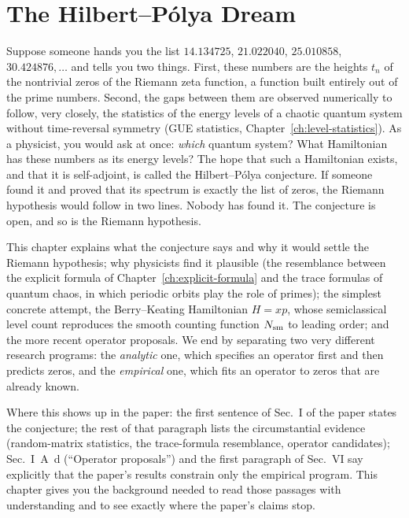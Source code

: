 \chapter{The Hilbert--P\'olya Dream}\label{ch:hilbert-polya}

\begin{chapterintro}
Suppose someone hands you the list $14.134725$, $21.022040$, $25.010858$, $30.424876,\dots$ and tells you two things. First, these numbers are the heights $t_n$ of the nontrivial zeros of the Riemann zeta function, a function built entirely out of the prime numbers. Second, the gaps between them are observed numerically to follow, very closely, the statistics of the energy levels of a chaotic quantum system without time-reversal symmetry (GUE statistics, Chapter~\ref{ch:level-statistics}). As a physicist, you would ask at once: \emph{which} quantum system? What Hamiltonian has these numbers as its energy levels? The hope that such a Hamiltonian exists, and that it is self-adjoint, is called the Hilbert--P\'olya conjecture. If someone found it and proved that its spectrum is exactly the list of zeros, the Riemann hypothesis would follow in two lines. Nobody has found it. The conjecture is open, and so is the Riemann hypothesis.

This chapter explains what the conjecture says and why it would settle the Riemann hypothesis; why physicists find it plausible (the resemblance between the explicit formula of Chapter~\ref{ch:explicit-formula} and the trace formulas of quantum chaos, in which periodic orbits play the role of primes); the simplest concrete attempt, the Berry--Keating Hamiltonian $H=xp$, whose semiclassical level count reproduces the smooth counting function $N_{\mathrm{sm}}$ to leading order; and the more recent operator proposals. We end by separating two very different research programs: the \emph{analytic} one, which specifies an operator first and then predicts zeros, and the \emph{empirical} one, which fits an operator to zeros that are already known.

Where this shows up in the paper: the first sentence of Sec.~I of the paper \cite{soniR1} states the conjecture; the rest of that paragraph lists the circumstantial evidence (random-matrix statistics, the trace-formula resemblance, operator candidates); Sec.~I~A~d (``Operator proposals'') and the first paragraph of Sec.~VI say explicitly that the paper's results constrain only the empirical program. This chapter gives you the background needed to read those passages with understanding and to see exactly where the paper's claims stop.
\end{chapterintro}


